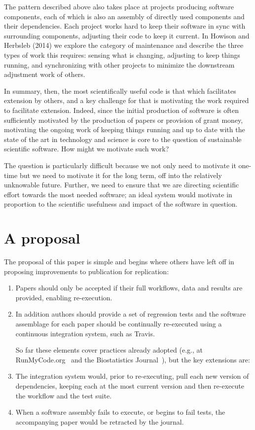 \documentclass{sigchi}
\begin{document}
The pattern described above also takes place at projects producing software components, each of which is also an assembly of directly used components and their dependencies. Each project works hard to keep their software in sync with surrounding components, adjusting their code to keep it current. In Howison and Herbsleb (2014)\cite{howison_sustainability} we explore the category of maintenance and describe the three types of work this requires: sensing what is changing, adjusting to keep things running, and synchronizing with other projects to minimize the downstream adjustment work of others.

In summary, then, the most scientifically useful code is that which facilitates extension by others, and a key challenge for that is motivating the work required to facilitate extension. Indeed, since the initial production of software is often sufficiently motivated by the production of papers or provision of grant money, motivating the ongoing work of keeping things running and up to date with the state of the art in technology and science is core to the question of sustainable scientific software.  How might we motivate such work?

The question is particularly difficult because we not only need to motivate it one-time but we need to motivate it for the long term, off into the relatively unknowable future. Further, we need to ensure that we are directing scientific effort towards the most needed software; an ideal system would motivate in proportion to the scientific usefulness and impact of the software in question.

\section{A proposal}

The proposal of this paper is simple and begins where others have left off in proposing improvements to publication for replication:

\begin{enumerate}
\item Papers should only be accepted if their full workflows, data and results are provided, enabling re-execution.

\item In addition authors should provide a set of regression tests and the software assemblage for each paper should be continually re-executed using a continuous integration system, such as Travis.

So far these elements cover practices already adopted (e.g., at RunMyCode.org~\cite{stodden_2012} and the Biostatistics Journal~\cite{peng_reproducible_2009}), but the key extensions are:

\item The integration system would, prior to re-executing, pull each new version of dependencies, keeping each at the most current version and then re-execute the workflow and the test suite.

\item When a software assembly fails to execute, or begins to fail tests, the accompanying paper would be retracted by the journal.
\end{enumerate}
\end{document}
